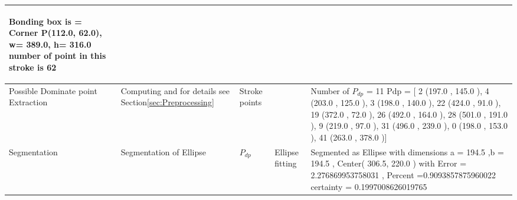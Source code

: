 \begin{landscape}
\begin{scriptsize}
\begin{longtable}{|p{2cm}|p{2cm}|p{2cm}|p{2cm}|p{13cm}|}
\begin{scriptsize}
 Bonding box is  = Corner P(112.0, 62.0), w= 389.0, h=  316.0
 number of point in this stroke is   62
\end{scriptsize}
 \\ \hline
Possible Dominate point Extraction & Computing and for details see Section\ref{sec:Preprocessing} &  Stroke points  &   &    Number of $P_{dp}$  = 11
 Pdp = [ 2 (197.0 , 145.0 ), 4 (203.0 , 125.0 ), 3 (198.0 , 140.0 ), 22 (424.0 , 91.0 ), 19 (372.0 , 72.0 ), 26 (492.0 , 164.0 ), 28 (501.0 , 191.0 ), 9 (219.0 , 97.0 ), 31 (496.0 , 239.0 ), 0 (198.0 , 153.0 ), 41 (263.0 , 378.0 )]

\\ \hline 
Segmentation & Segmentation of Ellipse & $P_{dp}$   &  Ellipse fitting  & 
 Segmented as Ellipse with dimensions  a = 194.5 ,b = 194.5 , Center( 306.5,  220.0 )   with Error =  2.276869953758031 , Percent =0.9093857875960022
 certainty  =  0.1997008626019765 
\\ \hline
 

\end{longtable}
\end{scriptsize}
\end{landscape}
